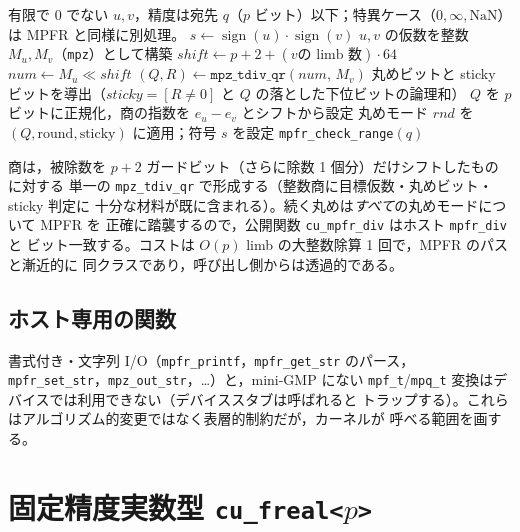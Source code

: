 \documentclass[uplatex,dvipdfmx,a4paper,11pt]{jsarticle}
\newcommand{\code}[1]{\texttt{#1}}
\newcommand{\PB}{\ensuremath{p}}
\begin{document}
\begin{algorithm}[h]
\caption{\code{mpfr\_div\_cuda}$(u,v,\mathit{rnd})$：デバイスで正しい，正しく丸められる除算}
\label{alg:div}
\begin{algorithmic}[1]
\Require 有限で 0 でない $u,v$，精度は宛先 $q$（\PB{} ビット）以下；特異ケース（$0,\infty,\mathrm{NaN}$）は MPFR と同様に別処理。
\State $s \gets \operatorname{sign}(u)\cdot\operatorname{sign}(v)$
\State $u,v$ の仮数を整数 $M_u,M_v$（\code{mpz}）として構築
\State $\mathit{shift} \gets \PB + 2 + (v \text{の limb 数})\cdot 64$ 
\State $\mathit{num} \gets M_u \ll \mathit{shift}$
\State $(Q,R) \gets \code{mpz\_tdiv\_qr}(\mathit{num},\,M_v)$ 
\State 丸めビットと sticky ビットを導出（$\mathit{sticky}=[R\neq 0]$ と $Q$ の落とした下位ビットの論理和）
\State $Q$ を \PB{} ビットに正規化，商の指数を $e_u-e_v$ とシフトから設定
\State 丸めモード $\mathit{rnd}$ を $(Q,\text{round},\text{sticky})$ に適用；符号 $s$ を設定
\State \Return \code{mpfr\_check\_range}$(q)$ \Comment{ホスト \code{mpfr\_div} とビット一致}
\end{algorithmic}
\end{algorithm}

商は，被除数を $\PB+2$ ガードビット（さらに除数 1 個分）だけシフトしたものに対する
単一の \code{mpz\_tdiv\_qr} で形成する（整数商に目標仮数・丸めビット・sticky 判定に
十分な材料が既に含まれる）。続く丸めは\emph{すべて}の丸めモードについて MPFR を
正確に踏襲するので，公開関数 \code{cu\_mpfr\_div} はホスト \code{mpfr\_div} と
ビット一致する。コストは $O(\PB)$ limb の大整数除算 1 回で，MPFR のパスと漸近的に
同クラスであり，呼び出し側からは透過的である。

\subsection{ホスト専用の関数}
書式付き・文字列 I/O（\code{mpfr\_printf}，\code{mpfr\_get\_str} のパース，
\code{mpfr\_set\_str}，\code{mpz\_out\_str}，\ldots）と，mini-GMP にない
\code{mpf\_t}/\code{mpq\_t} 変換はデバイスでは利用できない（デバイススタブは呼ばれると
トラップする）。これらはアルゴリズム的変更ではなく表層的制約だが，カーネルが
呼べる範囲を画する。


\section{固定精度実数型 \texorpdfstring{\code{cu\_freal<\PB>}}{cu\_freal<PB>}}
\label{sec:freal}
\end{document}
